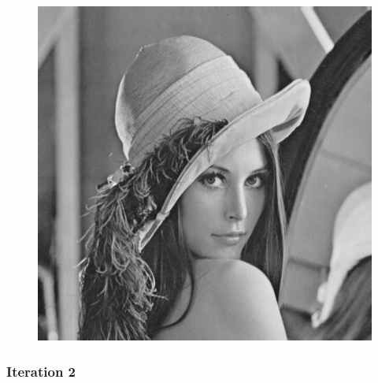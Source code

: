 \documentclass[11pt]{article}
\makeatletter
\def\maxwidth{\ifdim\Gin@nat@width>\linewidth\linewidth
    \else\Gin@nat@width\fi}
\let\Oldincludegraphics\includegraphics
\renewcommand{\includegraphics}[1]{\Oldincludegraphics[width=.8\maxwidth]{#1}}
\makeatother
\begin{document}
\begin{figure}[!htbp]
	\centering
	\includegraphics{"0th iterations_varying"}
	\label{fig:0th-iterationsvarying}
\end{figure}
\clearpage
    \hypertarget{iteration-2}{%
\subsubsection{Iteration 2}\label{iteration-2}}
\end{document}
